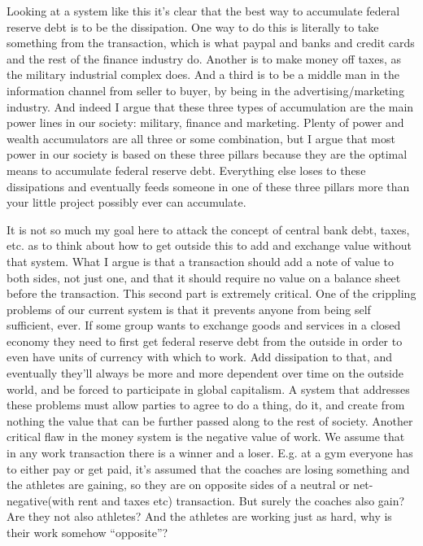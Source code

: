 Looking at a system like this it's clear that the best way to accumulate
federal reserve debt is to be the dissipation. One way to do this is
literally to take something from the transaction, which is what paypal
and banks and credit cards and the rest of the finance industry do.
Another is to make money off taxes, as the military industrial complex
does. And a third is to be a middle man in the information channel from
seller to buyer, by being in the advertising/marketing industry. And
indeed I argue that these three types of accumulation are the main power
lines in our society: military, finance and marketing. Plenty of power
and wealth accumulators are all three or some combination, but I argue
that most power in our society is based on these three pillars because
they are the optimal means to accumulate federal reserve debt.
Everything else loses to these dissipations and eventually feeds someone
in one of these three pillars more than your little project possibly
ever can accumulate.

It is not so much my goal here to attack the concept of central bank
debt, taxes, etc. as to think about how to get outside this to add and
exchange value without that system. What I argue is that a transaction
should add a note of value to both sides, not just one, and that it
should require no value on a balance sheet before the transaction. This
second part is extremely critical. One of the crippling problems of our
current system is that it prevents anyone from being self sufficient,
ever. If some group wants to exchange goods and services in a closed
economy they need to first get federal reserve debt from the outside in
order to even have units of currency with which to work. Add dissipation
to that, and eventually they'll always be more and more dependent over
time on the outside world, and be forced to participate in global
capitalism. A system that addresses these problems must allow parties to
agree to do a thing, do it, and create from nothing the value that can
be further passed along to the rest of society. Another critical flaw in
the money system is the negative value of work. We assume that in any
work transaction there is a winner and a loser. E.g. at a gym everyone
has to either pay or get paid, it's assumed that the coaches are losing
something and the athletes are gaining, so they are on opposite sides of
a neutral or net-negative(with rent and taxes etc) transaction. But
surely the coaches also gain? Are they not also athletes? And the
athletes are working just as hard, why is their work somehow
``opposite''?

